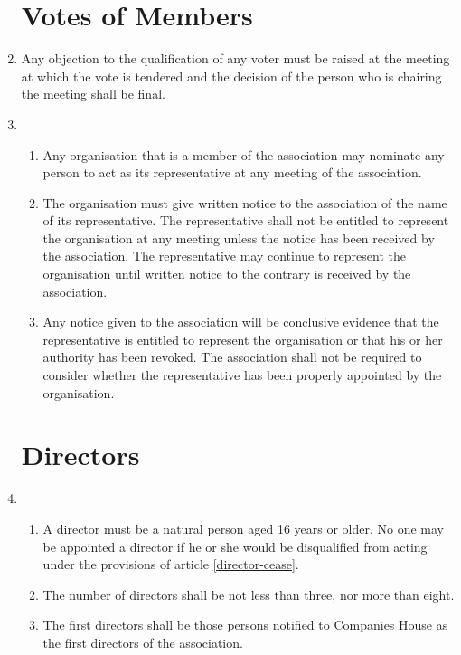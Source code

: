 \begin{enumerate}
\section{Votes of Members}

\item
  Any objection to the qualification of any voter must be raised at
  the meeting at which the vote is tendered and the decision of the
  person who is chairing the meeting shall be final.
\item
  \begin{enumerate}
  \item
    Any organisation that is a member of the association may nominate any
    person to act as its representative at any meeting of the association.
  \item
    The organisation must give written notice to the association of the
    name of its representative. The representative shall not be
    entitled to represent the organisation at any meeting unless the
    notice has been received by the association. The representative may
    continue to represent the organisation until written notice to the
    contrary is received by the association.
  \item
    Any notice given to the association will be conclusive evidence that
    the representative is entitled to represent the organisation or
    that his or her authority has been revoked. The association shall not
    be required to consider whether the representative has been
    properly appointed by the organisation.
  \end{enumerate}

\section{Directors}

\item
  \begin{enumerate}
  \item
    A director must be a natural person aged 16 years or older.
    No one may be appointed a director if he or she would be
    disqualified from acting under the provisions of article
    \ref{director-cease}.
  \item
    The number of directors shall be not less than three, nor more than eight.

  \item
    The first directors shall be those persons notified to Companies
    House as the first directors of the association.


\end{enumerate}
\end{enumerate}
